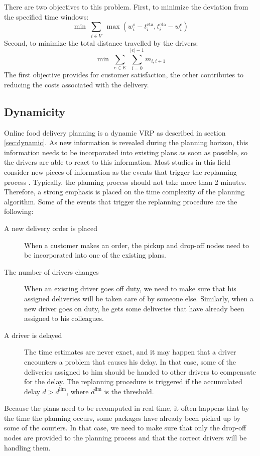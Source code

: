     There are two objectives to this problem. First, to minimize the deviation from the specified time windows: \[\min\;\sum_{i \in V}\;\max(w^s_i - t^{\mathrm{eta}}_i, t^{\mathrm{eta}}_i - w^e_i)\]
    Second, to minimize the total distance travelled by the drivers: \[\min\;\sum_{e \in E}\;\sum_{i = 0}^{|e|-1}m_{i,i+1}\]The first objective provides for customer satisfaction, the other contributes to reducing the costs associated with the delivery.

    \subsection{Dynamicity} \label{sec:dynamicity}
    
    Online food delivery planning is a dynamic VRP as described in section \ref{sec:dynamic}. As new information is revealed during the planning horizon, this information needs to be incorporated into existing plans as soon as possible, so the drivers are able to react to this information. Most studies in this field consider new pieces of information as the events that trigger the replanning process \cite{darp-survey}. Typically, the planning process should not take more than 2 minutes. Therefore, a strong emphasis is placed on the time complexity of the planning algorithm. Some of the events that trigger the replanning procedure are the following:
    
    \begin{description}
      \item [A new delivery order is placed] When a customer makes an order, the pickup and drop-off nodes need to be incorporated into one of the existing plans.
      \item [The number of drivers changes] When an existing driver goes off duty, we need to make sure that his assigned deliveries will be taken care of by someone else. Similarly, when a new driver goes on duty, he gets some deliveries that have already been assigned to his colleagues.
      \item [A driver is delayed] The time estimates are never exact, and it may happen that a driver encounters a problem that causes his delay. In that case, some of the deliveries assigned to him should be handed to other drivers to compensate for the delay. The replanning procedure is triggered if the accumulated delay $d > d^{\mathrm{lim}}$, where $d^{\mathrm{lim}}$ is the threshold.
    \end{description}
    
    Because the plans need to be recomputed in real time, it often happens that by the time the planning occurs, some packages have already been picked up by some of the couriers. In that case, we need to make sure that only the drop-off nodes are provided to the planning process and that the correct drivers will be handling them.
    
